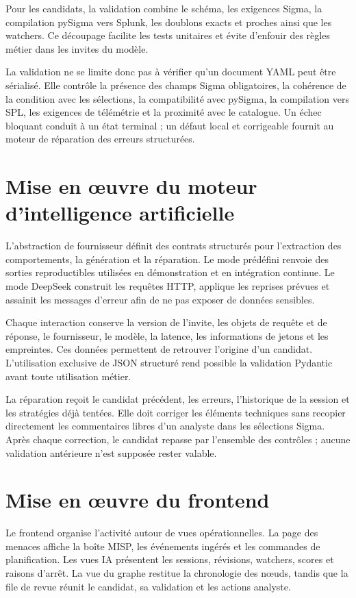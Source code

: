 Pour les candidats, la validation combine le schéma, les exigences Sigma, la compilation pySigma vers Splunk, les doublons exacts et proches ainsi que les watchers. Ce découpage facilite les tests unitaires et évite d'enfouir des règles métier dans les invites du modèle.

La validation ne se limite donc pas à vérifier qu'un document YAML peut être sérialisé. Elle contrôle la présence des champs Sigma obligatoires, la cohérence de la condition avec les sélections, la compatibilité avec pySigma, la compilation vers SPL, les exigences de télémétrie et la proximité avec le catalogue. Un échec bloquant conduit à un état terminal ; un défaut local et corrigeable fournit au moteur de réparation des erreurs structurées.

\section{Mise en œuvre du moteur d'intelligence artificielle}

L'abstraction de fournisseur définit des contrats structurés pour l'extraction des comportements, la génération et la réparation. Le mode prédéfini renvoie des sorties reproductibles utilisées en démonstration et en intégration continue. Le mode DeepSeek construit les requêtes HTTP, applique les reprises prévues et assainit les messages d'erreur afin de ne pas exposer de données sensibles.

Chaque interaction conserve la version de l'invite, les objets de requête et de réponse, le fournisseur, le modèle, la latence, les informations de jetons et les empreintes. Ces données permettent de retrouver l'origine d'un candidat. L'utilisation exclusive de JSON structuré rend possible la validation Pydantic avant toute utilisation métier.

La réparation reçoit le candidat précédent, les erreurs, l'historique de la session et les stratégies déjà tentées. Elle doit corriger les éléments techniques sans recopier directement les commentaires libres d'un analyste dans les sélections Sigma. Après chaque correction, le candidat repasse par l'ensemble des contrôles ; aucune validation antérieure n'est supposée rester valable.

\section{Mise en œuvre du frontend}

Le frontend organise l'activité autour de vues opérationnelles. La page des menaces affiche la boîte MISP, les événements ingérés et les commandes de planification. Les vues IA présentent les sessions, révisions, watchers, scores et raisons d'arrêt. La vue du graphe restitue la chronologie des nœuds, tandis que la file de revue réunit le candidat, sa validation et les actions analyste.

